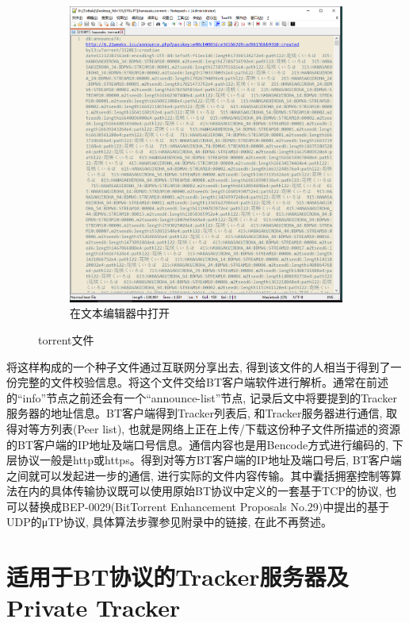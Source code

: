 \begin{figure}[ht!]
\begin{subfigure}{0.45\textwidth}
		\includegraphics[width=\textwidth]{support-files/2.1-torrent-file-in-text-editor.png} 
		\caption{在文本编辑器中打开}
		\label{fig:torrent_in_text_editor}
	\end{subfigure}
	\caption{torrent文件}
	\label{fig:torrent}
\end{figure}

将这样构成的一个种子文件通过互联网分享出去, 得到该文件的人相当于得到了一份完整的文件校验信息。将这个文件交给BT客户端软件进行解析。通常在前述的``info''节点之前还会有一个``announce-list''节点, 记录后文中将要提到的Tracker服务器的地址信息。BT客户端得到Tracker列表后, 和Tracker服务器进行通信, 取得对等方列表(Peer list), 也就是网络上正在上传/下载这份种子文件所描述的资源的BT客户端的IP地址及端口号信息。通信内容也是用Bencode方式进行编码的, 下层协议一般是http或https。得到对等方BT客户端的IP地址及端口号后, BT客户端之间就可以发起进一步的通信, 进行实际的文件内容传输。其中囊括拥塞控制等算法在内的具体传输协议既可以使用原始BT协议中定义的一套基于TCP的协议, 也可以替换成BEP-0029\cite{arvidnorberg2009bep0029}(BitTorrent Enhancement Proposals No.29)中提出的基于UDP的μTP协议, 具体算法步骤参见附录中的链接, 在此不再赘述。


\section{适用于BT协议的Tracker服务器及Private Tracker}
\label{sec:TrackerAndPrivateTracker}

